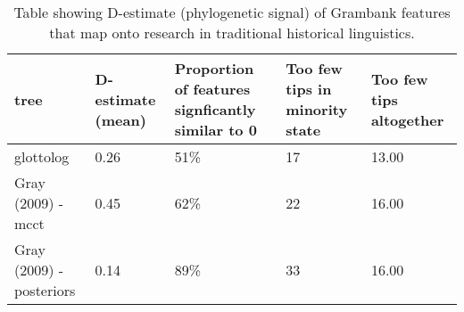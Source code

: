 \begin{table}[ht]
\centering
\begin{tabular}{p{5cm}p{3cm}p{3.5cm}p{3.5cm}p{3.5cm}}
  \hline
tree & D-estimate (mean) & Proportion of features signficantly similar to 0 & Too few tips in minority state & Too few tips altogether \\ 
  \hline
glottolog & 0.26 & 51\% &  17 & 13.00 \\ 
  Gray (2009) - mcct & 0.45 & 62\% &  22 & 16.00 \\ 
  Gray (2009) - posteriors & 0.14 & 89\% &  33 & 16.00 \\ 
   \hline
\end{tabular}
\caption{Table showing D-estimate (phylogenetic signal) of Grambank features that map onto research in traditional historical linguistics.} 
\label{d_estimate_summary}
\end{table}
